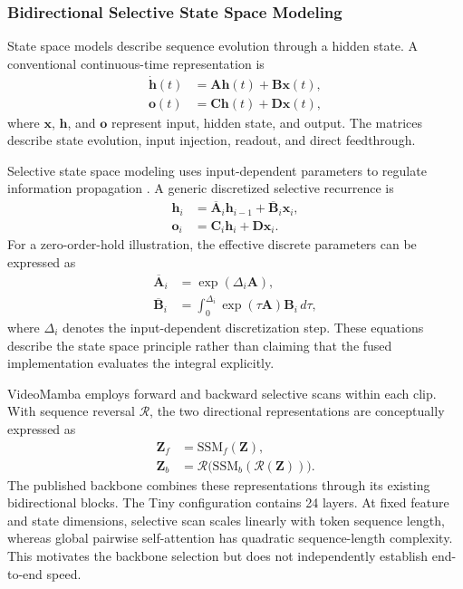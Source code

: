 \documentclass{ieeeaccess}
\begin{document}
\subsubsection{Bidirectional Selective State Space Modeling}
State space models describe sequence evolution through a hidden state. A conventional continuous-time representation is
\begin{align}
\dot{\mathbf h}(t)&=\mathbf A\mathbf h(t)+\mathbf B\mathbf x(t),\\
\mathbf o(t)&=\mathbf C\mathbf h(t)+\mathbf D\mathbf x(t),
\end{align}
where $\mathbf x$, $\mathbf h$, and $\mathbf o$ represent input, hidden state, and output. The matrices describe state evolution, input injection, readout, and direct feedthrough.

Selective state space modeling uses input-dependent parameters to regulate information propagation \cite{gu2024mamba}. A generic discretized selective recurrence is
\begin{align}
\mathbf h_i&=\overline{\mathbf A}_i\mathbf h_{i-1}
+\overline{\mathbf B}_i\mathbf x_i,\label{eq:ssm_state}\\
\mathbf o_i&=\mathbf C_i\mathbf h_i+\mathbf D\mathbf x_i.
\label{eq:ssm_output}
\end{align}
For a zero-order-hold illustration, the effective discrete parameters can be expressed as
\begin{align}
\overline{\mathbf A}_i&=\exp(\Delta_i\mathbf A),\\
\overline{\mathbf B}_i&=\int_0^{\Delta_i}
\exp(\tau\mathbf A)\mathbf B_i\,d\tau,
\end{align}
where $\Delta_i$ denotes the input-dependent discretization step. These equations describe the state space principle rather than claiming that the fused implementation evaluates the integral explicitly.

VideoMamba employs forward and backward selective scans within each clip. With sequence reversal $\mathcal R$, the two directional representations are conceptually expressed as
\begin{align}
\mathbf Z_f&=\mathrm{SSM}_f(\mathbf Z),\\
\mathbf Z_b&=\mathcal R\bigl(\mathrm{SSM}_b(\mathcal R(\mathbf Z))\bigr).
\end{align}
The published backbone combines these representations through its existing bidirectional blocks. The Tiny configuration contains 24 layers. At fixed feature and state dimensions, selective scan scales linearly with token sequence length, whereas global pairwise self-attention has quadratic sequence-length complexity. This motivates the backbone selection but does not independently establish end-to-end speed.
\end{document}
